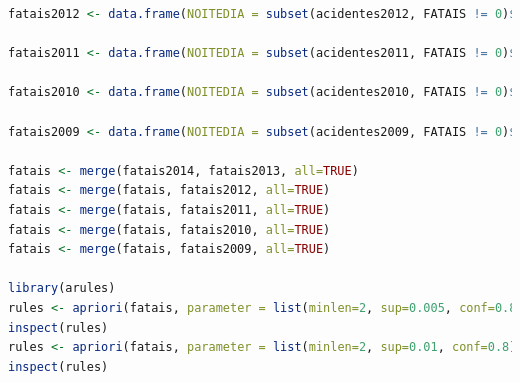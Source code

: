 \documentclass[11pt,article,oneside,a4paper]{abntex2}
\begin{document}
\begin{small}
\begin{lstlisting}[language=R,frame=shadowbox, breaklines=true, commentstyle=\textit]
fatais2012 <- data.frame(NOITEDIA = subset(acidentes2012, FATAIS != 0)$NOITE_DIA, LOCAL = subset(acidentes2012, FATAIS != 0)$LOCAL, DIASEM = subset(acidentes2012, FATAIS != 0)$DIA_SEM, LOG1 = subset(acidentes2012, FATAIS != 0)$LOG1, TIPO_ACID = subset(acidentes2012, FATAIS != 0)$TIPO_ACID, LOCAL = subset(acidentes2012, FATAIS != 0)$LOCAL, TEMPO = subset(acidentes2012, FATAIS != 0)$TEMPO, REGIAO = subset(acidentes2012, FATAIS != 0)$REGIAO)

fatais2011 <- data.frame(NOITEDIA = subset(acidentes2011, FATAIS != 0)$NOITE_DIA, LOCAL = subset(acidentes2011, FATAIS != 0)$LOCAL, DIASEM = subset(acidentes2011, FATAIS != 0)$DIA_SEM, LOG1 = subset(acidentes2011, FATAIS != 0)$LOG1, TIPO_ACID = subset(acidentes2011, FATAIS != 0)$TIPO_ACID, LOCAL = subset(acidentes2011, FATAIS != 0)$LOCAL, TEMPO = subset(acidentes2011, FATAIS != 0)$TEMPO, REGIAO = subset(acidentes2011, FATAIS != 0)$REGIAO)

fatais2010 <- data.frame(NOITEDIA = subset(acidentes2010, FATAIS != 0)$NOITE_DIA, LOCAL = subset(acidentes2010, FATAIS != 0)$LOCAL, DIASEM = subset(acidentes2010, FATAIS != 0)$DIA_SEM, LOG1 = subset(acidentes2010, FATAIS != 0)$LOG1, TIPO_ACID = subset(acidentes2010, FATAIS != 0)$TIPO_ACID, LOCAL = subset(acidentes2010, FATAIS != 0)$LOCAL, TEMPO = subset(acidentes2010, FATAIS != 0)$TEMPO, REGIAO = subset(acidentes2010, FATAIS != 0)$REGIAO)

fatais2009 <- data.frame(NOITEDIA = subset(acidentes2009, FATAIS != 0)$NOITE_DIA, LOCAL = subset(acidentes2009, FATAIS != 0)$LOCAL, DIASEM = subset(acidentes2009, FATAIS != 0)$DIA_SEM, LOG1 = subset(acidentes2009, FATAIS != 0)$LOG1, TIPO_ACID = subset(acidentes2009, FATAIS != 0)$TIPO_ACID, LOCAL = subset(acidentes2009, FATAIS != 0)$LOCAL, TEMPO = subset(acidentes2009, FATAIS != 0)$TEMPO, REGIAO = subset(acidentes2009, FATAIS != 0)$REGIAO)

fatais <- merge(fatais2014, fatais2013, all=TRUE)
fatais <- merge(fatais, fatais2012, all=TRUE)
fatais <- merge(fatais, fatais2011, all=TRUE)
fatais <- merge(fatais, fatais2010, all=TRUE)
fatais <- merge(fatais, fatais2009, all=TRUE)

library(arules)
rules <- apriori(fatais, parameter = list(minlen=2, sup=0.005, conf=0.8), appearance = list(rhs=c("NOITEDIA=NOITE","NOITEDIA=DIA"), default="lhs"), control=list(verbose=F))
inspect(rules)
rules <- apriori(fatais, parameter = list(minlen=2, sup=0.01, conf=0.8), appearance = list(rhs=c("TIPO_ACID=ATROPELAMENTO", "TIPO_ACID=CHOQUE", "TIPO_ACID=ALBAROAMENTO"), default="lhs"), control=list(verbose=F))
inspect(rules)
\end{lstlisting}
\end{small}
\end{document}
